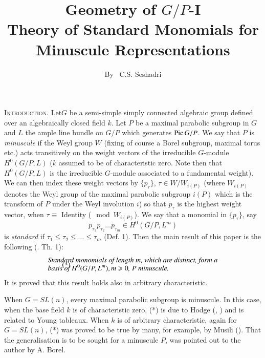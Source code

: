 \title{Geometry of \texorpdfstring{$G/P$}{GP}-I\\ Theory of Standard Monomials for\\ Minuscule Representations}\label{art18}

\author{By~ C.S. Seshadri}

\date{}
\maketitle

\setcounter{page}{245}

\textsc{Introduction.}
\setcounter{pageoriginal}{206} Let\pageoriginale  $G$ be a semi-simple simply connected algebraic group defined over an algebraically closed field $k$. Let $P$ be a maximal parabolic subgroup in $G$ and $L$ the ample line bundle on $G/P$ which generates $\operatorname{Pic} G/P$. We say that $P$ is {\em minuscule} if the Weyl group $W$ (fixing of course a Borel subgroup, maximal torus etc.) acts transitively on the weight vectors of the irreducible $G$-module $H^0(G/P, L)$ ($k$ assumed to be of characteristic zero. Note then that $H^0(G/P,L)$ is the irreducible $G$-module associated to a fundamental weight). We can then index these weight vectors by $\{p_\tau\}$, $\tau \in W / W_{i(P)}$  (where $W_{i(P)}$ denotes the Weyl group of the maximal parabolic subgroup $i(P)$ which is the transform of $P$ under the Weyl involution $i$) so that $p_\tau$ is the highest weight vector, when $\tau \equiv$ Identity ($\mod W_{i(P)}$). We say that a monomial in $\{p_\tau\}$, say 
$$
p_{\tau_1} p_{\tau_2} \ldots p_{\tau_m} \in H^0(G/P, L^m)
$$
is {\em standard} if $\tau_1 \leqslant \tau_2 \leqslant \ldots \leqslant \tau_m$ (\cf Def. 1). Then the main result of this paper is the following (\cf. Th. 1):
\begin{align*}
& \text{{\em Standard monomials of length $m$, which are distinct, form a}}\\[-0.3cm]
& \tag{*}\\[-0.4cm]
& \text{{\em basis of $H^0 (G/P, L^m), m \geqslant 0$, $P$ minuscule.}}
\end{align*}
It is proved that this result holds also in arbitrary characteristic.

When $G = S L(n)$, every maximal parabolic subgroup is minuscule. In this case, when the base field $k$ is of characteristic zero, (*) is due to Hodge (\cf \cite{art18-key9}, \cite{art18-key10}) and is related to Young tableaux. When $k$ is of arbitrary characteristic, again for $G = S L(n)$, (*) was proved to be true by many, for example, by Musili (\cf \cite{art18-key13}). That the generalisation is to be sought for a minuscule $P$, was pointed out to the author by A. Borel.


